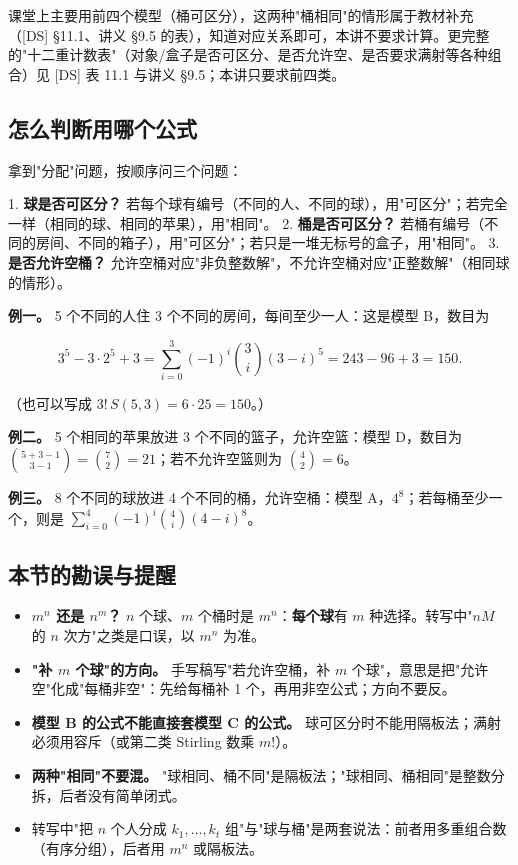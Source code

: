课堂上主要用前四个模型（桶可区分），这两种"桶相同"的情形属于教材补充（[DS] §11.1、讲义 §9.5 的表），知道对应关系即可，本讲不要求计算。更完整的"十二重计数表"（对象/盒子是否可区分、是否允许空、是否要求满射等各种组合）见 [DS] 表 11.1 与讲义 §9.5；本讲只要求前四类。

\subsection{怎么判断用哪个公式}


拿到"分配"问题，按顺序问三个问题：

1. \textbf{球是否可区分？} 若每个球有编号（不同的人、不同的球），用"可区分"；若完全一样（相同的球、相同的苹果），用"相同"。
2. \textbf{桶是否可区分？} 若桶有编号（不同的房间、不同的箱子），用"可区分"；若只是一堆无标号的盒子，用"相同"。
3. \textbf{是否允许空桶？} 允许空桶对应"非负整数解"，不允许空桶对应"正整数解"（相同球的情形）。

\textbf{例一。} 5 个不同的人住 3 个不同的房间，每间至少一人：这是模型 B，数目为

\[
3^5-3\cdot2^5+3=\sum_{i=0}^{3}(-1)^i\binom3i(3-i)^5=243-96+3=150.
\]

（也可以写成 $3!\,S(5,3)=6\cdot25=150$。）

\textbf{例二。} 5 个相同的苹果放进 3 个不同的篮子，允许空篮：模型 D，数目为 $\binom{5+3-1}{3-1}=\binom72=21$；若不允许空篮则为 $\binom{4}{2}=6$。

\textbf{例三。} 8 个不同的球放进 4 个不同的桶，允许空桶：模型 A，$4^8$；若每桶至少一个，则是 $\sum_{i=0}^{4}(-1)^i\binom4i(4-i)^8$。

\subsection{本节的勘误与提醒}


\begin{itemize}
\item \textbf{$m^n$ 还是 $n^m$？} $n$ 个球、$m$ 个桶时是 $m^n$：\textbf{每个球}有 $m$ 种选择。转写中"$nM$ 的 $n$ 次方"之类是口误，以 $m^n$ 为准。
\item \textbf{"补 $m$ 个球"的方向。} 手写稿写"若允许空桶，补 $m$ 个球"，意思是把"允许空"化成"每桶非空"：先给每桶补 1 个，再用非空公式；方向不要反。
\item \textbf{模型 B 的公式不能直接套模型 C 的公式。} 球可区分时不能用隔板法；满射必须用容斥（或第二类 Stirling 数乘 $m!$）。
\item \textbf{两种"相同"不要混。} "球相同、桶不同"是隔板法；"球相同、桶相同"是整数分拆，后者没有简单闭式。
\item 转写中"把 $n$ 个人分成 $k_1,\dots,k_t$ 组"与"球与桶"是两套说法：前者用多重组合数（有序分组），后者用 $m^n$ 或隔板法。
\end{itemize}

